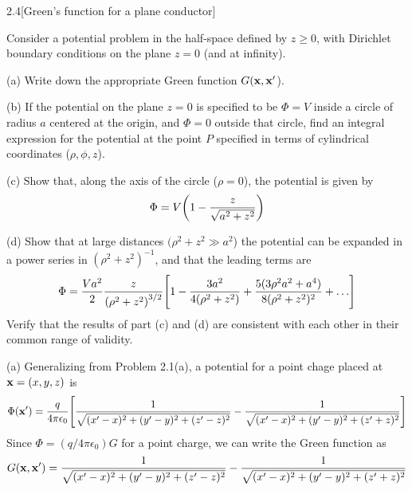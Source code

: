 \documentclass[12pt]{article}
\begin{document}
\begin{problem}{2.4}[Green's function for a plane conductor]

Consider a potential problem in the half-space defined by $z\geq 0$, with
Dirichlet boundary conditions on the plane $z=0$ (and at infinity).

(a) Write down the appropriate Green function $G(\vb{x},\vb{x}'$).

(b) If the potential on the plane $z=0$ is specified to be $\Phi=V$ inside a
circle of radius $a$ centered at the origin, and $\Phi=0$ outside that circle,
find an integral expression for the potential at the point $P$ specified in
terms of cylindrical coordinates ($\rho,\phi,z$).

(c) Show that, along the axis of the circle ($\rho=0$), the potential is given
by
\begin{equation}
    \Phi=V\qty(1-\frac{z}{\sqrt{a^2+z^2}}) 
\end{equation}

(d) Show that at large distances $(\rho^2+z^2\gg a^2$) the potential can be
expanded in a power series in $(\rho^2+z^2)^{-1}$, and that the leading terms
are
\begin{equation}\label{p4d:wts}
    \Phi=\frac{Va^2}{2}\frac{z}{\qty(\rho^2+z^2)^{3/2}}\qty[
        1-\frac{3a^2}{4(\rho^2+z^2)}+
        \frac{5(3\rho^2a^2+a^4)}{8(\rho^2+z^2)^2}+\hdots
    ]
\end{equation}
Verify that the results of part (c) and (d) are consistent with each other in
their common range of validity.

\begin{solution}

(a) Generalizing from Problem 2.1(a), a potential for a point chage placed at
$\vb{x}=(x,y,z)$ is
\begin{equation}
    \Phi(\vb{x}')=\frac{q}{4\pi\epsilon_0}
        \qty[
            \frac1{\sqrt{(x'-x)^2+(y'-y)^2+(z'-z)^2}}
            -\frac1{\sqrt{(x'-x)^2+(y'-y)^2+(z'+z)^2}}
        ]
\end{equation}
Since $\Phi=(q/4\pi\epsilon_0)G$ for a point charge, we can write the Green
function as
\begin{equation}
    G(\vb{x},\vb{x}')=\frac1{\sqrt{(x'-x)^2+(y'-y)^2+(z'-z)^2}}
            -\frac1{\sqrt{(x'-x)^2+(y'-y)^2+(z'+z)^2}}
\end{equation}


\end{solution}
\end{problem}
\end{document}
